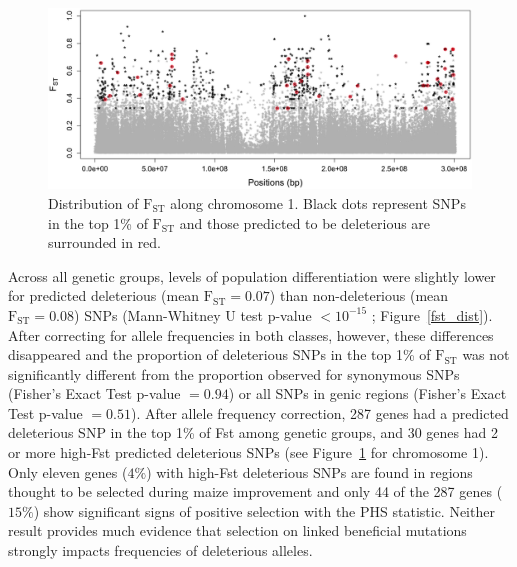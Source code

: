 \documentclass[12pt]{article}
\begin{document}
\begin{figure}[!t]
  \begin{center}
   \includegraphics[width=150mm]{Fst2.png}
    \caption{Distribution of $\mathrm{F}_{\mathrm{ST}}$ along chromosome 1.  Black dots represent SNPs in the top 1\% of $\mathrm{F}_{\mathrm{ST}}$ and those predicted to be deleterious are surrounded in red.} 
   \label{fst_chr1}
  \end{center}
\end{figure}


Across all genetic groups, levels of population differentiation were slightly lower for predicted deleterious (mean $\mathrm{F}_{\mathrm{ST}}=0.07$) than non-deleterious (mean $\mathrm{F}_{\mathrm{ST}}=0.08$) SNPs (Mann-Whitney U test p-value $< 10^{-15}$ ; Figure~\ref{fst_dist}). After correcting 
for allele frequencies in both classes, however, these differences disappeared and the proportion of deleterious SNPs in the top 1\% of $\mathrm{F}_{\mathrm{ST}}$ was not significantly different from the proportion observed for synonymous SNPs (Fisher's Exact Test p-value $= 0.94$) or all SNPs in genic regions (Fisher's Exact Test p-value $= 0.51$).
After allele frequency correction, 287 genes had a predicted deleterious SNP in the top 1\% of Fst among genetic groups, and 30 genes had 2 or more high-Fst predicted deleterious SNPs (see Figure~\ref{fst_chr1} for chromosome 1).  Only eleven genes ($4\%$) with high-Fst deleterious SNPs  are found in regions thought to be selected during maize improvement  \citep{Hufford2012} and only 44 of the 287 genes ($15\%$) show significant signs of positive selection with the PHS statistic. Neither result provides much evidence that selection on linked beneficial mutations strongly impacts frequencies of deleterious alleles.
\end{document}
